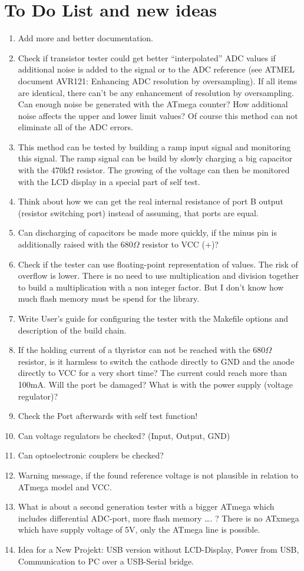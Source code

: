 
\chapter{To Do List and new ideas}
\label{sec:todo}

\begin{enumerate}
\item Add more and better documentation.
\item Check if transistor tester could get better “interpolated” ADC values if additional noise is added to the signal or to the ADC reference (see ATMEL document AVR121: Enhancing ADC resolution by oversampling).
If all items are identical, there can't be any enhancement of resolution by oversampling. Can enough noise be generated with the ATmega counter?
How additional noise affects  the upper and lower limit values?
Of course this method can not eliminate all of the ADC errors. 
\item This method can be tested by building a ramp input signal and monitoring this signal.
The ramp signal can be build by slowly charging a big capacitor with the 470kΩ resistor.
The growing of the voltage can then be monitored with the LCD display in a special part of self test.
\item Think about how we can get the real internal resistance of port B output (resistor switching port) instead of assuming, that ports are equal.
\item Can discharging of capacitors be made more quickly, if the minus pin is additionally raised
with the \(680\Omega\) resistor to VCC (+)?
\item Check if the tester can use floating-point representation of  values. The risk of overflow  is lower.
There is no need to use multiplication and division together to build a multiplication with a non integer factor.
But I don't know how much flash memory must be spend for the library.
\item Write User's guide for configuring the tester with the Makefile options and description of the build chain.
\item If the holding current of a thyristor can not be reached with the \(680\Omega\) resistor, is it harmless to switch the cathode directly to GND
and the anode directly to VCC for a very short time?
The current could reach more than 100mA. Will the port be damaged? What is with the power supply (voltage regulator)?
\item Check the Port afterwards with self test function!
\item Can voltage regulators be checked? (Input, Output, GND)
\item Can optoelectronic couplers be checked?  
\item Warning message, if the found reference voltage is not plausible in relation to ATmega model and VCC.
\item What is about a second generation tester with a bigger ATmega which includes differential ADC-port, more flash memory …. ?
There is no ATxmega which have supply voltage of 5V, only the ATmega line  is possible. 
\item Idea for a New Projekt: USB  version without LCD-Display, Power from USB, Communication to PC over a USB-Serial bridge.
\end{enumerate}
